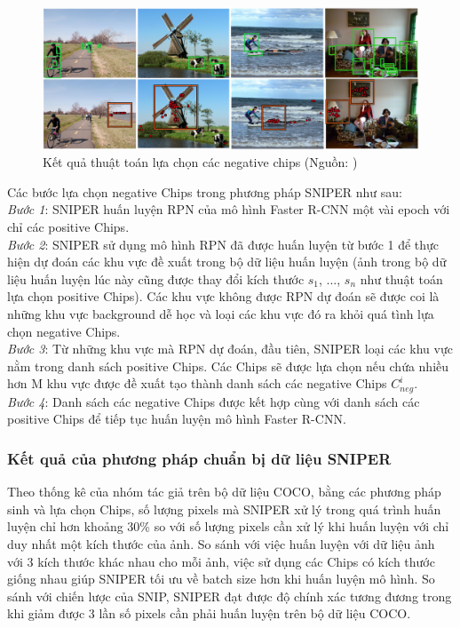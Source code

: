 {    \begin{figure}[H]
        \centering
        \includegraphics[width=13cm] {images/sniper_neg_chip}
        \caption{Kết quả thuật toán lựa chọn các negative chips (Nguồn: \cite{singh2018sniper})}
        \label{fig:sniper_pos_chip}
    \end{figure}

    \noindent
    Các bước lựa chọn negative Chips trong phương pháp SNIPER  như sau: \\
    \textit{Bước 1}: SNIPER  huấn luyện RPN của mô hình Faster R-CNN một vài epoch với chỉ các positive Chips. \\
    \textit{Bước 2}: SNIPER  sử dụng mô hình RPN đã được huấn luyện từ bước 1 để thực hiện dự đoán các khu vực đề xuất trong bộ dữ liệu huấn luyện (ảnh trong bộ dữ liệu huấn luyện lúc này cũng được thay đổi kích thước {${s}_{1}$, ..., ${s}_{n}$} như thuật toán lựa chọn positive Chips).
    Các khu vực không được RPN dự đoán sẽ được coi là những khu vực background  dễ học và loại các khu vực đó ra khỏi quá tình lựa chọn negative Chips. \\
    \textit{Bước 3}: Từ những khu vực mà RPN dự đoán, đầu tiên, SNIPER  loại các khu vực nằm trong danh sách positive Chips.
    Các Chips sẽ được lựa chọn nếu chứa nhiều hơn M khu vực được đề xuất tạo thành danh sách các negative Chips ${C}_{neg}^{i}$. \\
    \textit{Bước 4}: Danh sách các negative Chips được kết hợp cùng với danh sách các positive Chips để tiếp tục huấn luyện mô hình Faster R-CNN.

    \subsubsection{Kết quả của phương pháp chuẩn bị dữ liệu SNIPER }
    Theo thống kê của nhóm tác giả trên bộ dữ liệu COCO, bằng các phương pháp sinh và lựa chọn Chips, số lượng pixels  mà SNIPER  xử lý trong quá trình huấn luyện chỉ hơn khoảng 30\% so với số lượng pixels  cần xử lý khi huấn luyện với chỉ duy nhất một kích thước của ảnh.
    So sánh với việc huấn luyện với dữ liệu ảnh với 3 kích thước khác nhau cho mỗi ảnh, việc sử dụng các Chips có kích thước giống nhau giúp SNIPER  tối ưu về batch size hơn khi huấn luyện mô hình.
    So sánh với chiến lược của SNIP, SNIPER  đạt được độ chính xác tương đương trong khi giảm được 3 lần số pixels  cần phải huấn luyện trên bộ dữ liệu COCO.

}
